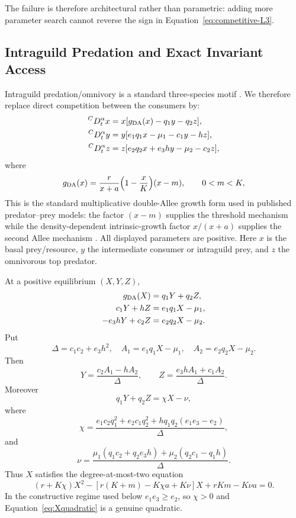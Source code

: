 The failure is therefore architectural rather than parametric: adding more parameter search cannot reverse the sign in Equation~\eqref{eq:competitive-L3}.

\subsection{Intraguild Predation and Exact Invariant Access}

Intraguild predation/omnivory is a standard three-species motif \cite{HoltPolis1997,BaiKangRuanWang2021,Panja2019}. We therefore replace direct competition between the consumers by:
\begin{align}
 {}^CD_t^\alpha x
 &=
 x[g_{\rm DA}(x)-q_1y-q_2z],
 \nonumber\\
 {}^CD_t^\alpha y
 &=
 y[e_1q_1x-\mu_1-c_1y-hz],
 \label{eq:igp-model}\\
 {}^CD_t^\alpha z
 &=
 z[e_2q_2x+e_3hy-\mu_2-c_2z],
 \nonumber
\end{align}
where
\begin{equation}
 g_{\rm DA}(x)
 =
 \frac{r}{x+a}
 \left(1-\frac{x}{K}\right)(x-m),
 \qquad
 0<m<K,
 \label{eq:gDA}
\end{equation}
This is the standard multiplicative double-Allee growth form used in published predator--prey models: the factor \((x-m)\) supplies the threshold mechanism while the density-dependent intrinsic-growth factor \(x/(x+a)\) supplies the second Allee mechanism \cite{ChaosSolitonsFractals2015DoubleAllee,FractalFract2026DoubleAllee,Mondal2025}. All displayed parameters are positive. Here \(x\) is the basal prey/resource, \(y\) the intermediate consumer or intraguild prey, and \(z\) the omnivorous top predator.

At a positive equilibrium \((X,Y,Z)\),
\begin{align}
 g_{\rm DA}(X)&=q_1Y+q_2Z,\label{eq:eq1}\\
 c_1Y+hZ&=e_1q_1X-\mu_1,\label{eq:eq2}\\
 -e_3hY+c_2Z&=e_2q_2X-\mu_2.\label{eq:eq3}
\end{align}
Put
\[
 \Delta=c_1c_2+e_3h^2,
 \quad
 A_1=e_1q_1X-\mu_1,
 \quad
 A_2=e_2q_2X-\mu_2.
\]
Then
\begin{equation}
 Y=\frac{c_2A_1-hA_2}{\Delta},
 \qquad
 Z=\frac{e_3hA_1+c_1A_2}{\Delta}.
 \label{eq:YZ}
\end{equation}
Moreover
\begin{equation}
 q_1Y+q_2Z=\chi X-\nu,
 \label{eq:affine-predation}
\end{equation}
where
\begin{equation}
 \chi=
 \frac{
 e_1c_2q_1^2+e_2c_1q_2^2
 +hq_1q_2(e_1e_3-e_2)
 }{\Delta},
 \label{eq:chi}
\end{equation}
and
\[
 \nu=
 \frac{
 \mu_1(q_1c_2+q_2e_3h)
 +\mu_2(q_2c_1-q_1h)
 }{\Delta}.
\]
Thus \(X\) satisfies the degree-at-most-two equation
\begin{equation}
 (r+K\chi)X^2
 -
 [r(K+m)-K\chi a+K\nu]X
 +
 rKm-K\nu a
 =0.
 \label{eq:Xquadratic}
\end{equation}
In the constructive regime used below \(e_1e_3\ge e_2\), so \(\chi>0\) and Equation~\eqref{eq:Xquadratic} is a genuine quadratic.

